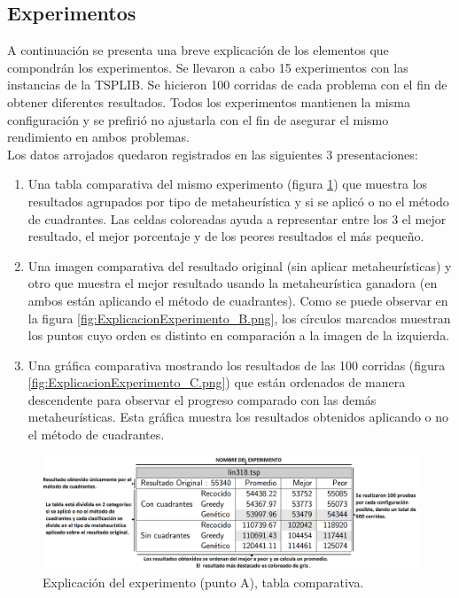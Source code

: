 \clearpage \newpage

\subsection{Experimentos}
A continuación se presenta una breve explicación de los elementos que compondrán los experimentos. Se llevaron a cabo 15 experimentos con las instancias de la TSPLIB. Se hicieron 100 corridas de cada problema con el fin de obtener diferentes resultados. Todos los experimentos mantienen la misma configuración y se prefirió no ajustarla con el fin de asegurar el mismo rendimiento en ambos problemas.\\
Los datos arrojados quedaron registrados en las siguientes 3 presentaciones:\\

\begin{enumerate}[label=\Alph*.-]
\item Una tabla comparativa del mismo experimento (figura \ref {fig:ExplicacionExperimento_A.png}) que muestra los resultados agrupados por tipo de metaheurística y si se aplicó o no el método de cuadrantes. Las celdas coloreadas ayuda a representar entre los 3 el mejor resultado, el mejor porcentaje y de los peores resultados el más pequeño.
\item Una imagen comparativa del resultado original (sin aplicar metaheurísticas) y otro que muestra el mejor resultado usando la metaheurística ganadora (en ambos están aplicando el método de cuadrantes). Como se puede observar en la figura \ref {fig:ExplicacionExperimento_B.png}, los círculos marcados muestran los puntos cuyo orden es distinto en comparación a la imagen de la izquierda.
\item Una gráfica comparativa mostrando los resultados de las 100 corridas (figura \ref {fig:ExplicacionExperimento_C.png}) que están ordenados de manera descendente para observar el progreso comparado con las demás metaheurísticas. Esta gráfica muestra los resultados obtenidos aplicando o no el método de cuadrantes.
\end{enumerate}

\clearpage \newpage

\begin{figure}[hbtp]
    \centering
        \includegraphics[width=1\textwidth]{PruebasResultados/Imagenes/ExplicacionExperimento_A.png}
        \caption{Explicación del experimento (punto A), tabla comparativa.}
        \label{fig:ExplicacionExperimento_A.png}
\end{figure}

